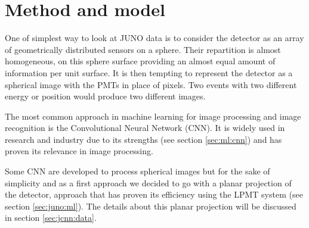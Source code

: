 \documentclass[../main.tex]{subfiles}
\begin{document}
\section{Method and model}

One of simplest way to look at JUNO data is to consider the detector as an array of geometrically distributed sensors on a sphere. Their repartition is almost homogeneous, on this sphere surface providing an almost equal amount of information per unit surface. It is then tempting to represent the detector as a spherical image with the PMTs in place of pixels. Two events with two different energy or position would produce two different images.

The most common approach in machine learning for image processing and image recognition is the Convolutional Neural Network (CNN). It is widely used in research and industry \cite{simonyan_very_2015, ciresan_multi-column_2012, abbasi_convolutional_2021, maksimovic_cnns_2021} due to its strengths (see section \ref{sec:ml:cnn}) and has proven its relevance in image processing.

Some CNN are developed to process spherical images \cite{cohen_spherical_2018} but for the sake of simplicity and as a first approach we decided to go with a planar projection of the detector, approach that has proven its efficiency using the LPMT system (see section \ref{sec:juno:ml}). The details about this planar projection will be discussed in section \ref{sec:jcnn:data}.
\end{document}
